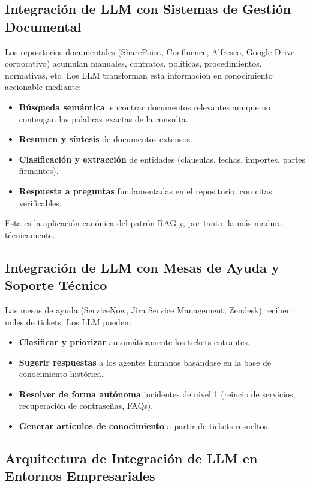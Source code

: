 \documentclass[12pt,a4paper,oneside]{article}
\begin{document}
\subsection{Integración de LLM con Sistemas de Gestión Documental}

Los repositorios documentales (SharePoint, Confluence, Alfresco, Google Drive corporativo) acumulan manuales, contratos, políticas, procedimientos, normativas, etc. Los LLM transforman esta información en conocimiento accionable mediante:

\begin{itemize}[leftmargin=*]
    \item \textbf{Búsqueda semántica}: encontrar documentos relevantes aunque no contengan las palabras exactas de la consulta.
    \item \textbf{Resumen y síntesis} de documentos extensos.
    \item \textbf{Clasificación y extracción} de entidades (cláusulas, fechas, importes, partes firmantes).
    \item \textbf{Respuesta a preguntas} fundamentadas en el repositorio, con citas verificables.
\end{itemize}

Esta es la aplicación canónica del patrón RAG y, por tanto, la más madura técnicamente.

\subsection{Integración de LLM con Mesas de Ayuda y Soporte Técnico}

Las mesas de ayuda (ServiceNow, Jira Service Management, Zendesk) reciben miles de tickets. Los LLM pueden:

\begin{itemize}[leftmargin=*]
    \item \textbf{Clasificar y priorizar} automáticamente los tickets entrantes.
    \item \textbf{Sugerir respuestas} a los agentes humanos basándose en la base de conocimiento histórica.
    \item \textbf{Resolver de forma autónoma} incidentes de nivel 1 (reincio de servicios, recuperación de contraseñas, FAQs).
    \item \textbf{Generar artículos de conocimiento} a partir de tickets resueltos.
\end{itemize}

\subsection{Arquitectura de Integración de LLM en Entornos Empresariales}
\end{document}
